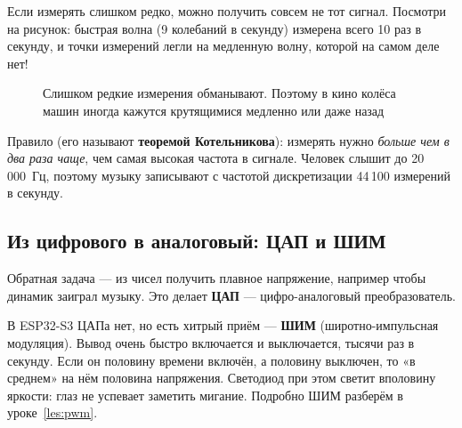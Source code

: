 Если измерять слишком редко, можно получить совсем не тот сигнал. Посмотри на рисунок: быстрая волна
(9 колебаний в секунду) измерена всего 10 раз в секунду, и точки измерений легли на медленную волну,
которой на самом деле нет!

\begin{figure}[H]
\centering
{}
\caption{Слишком редкие измерения обманывают. Поэтому в кино колёса машин иногда
кажутся крутящимися медленно или даже назад}
\end{figure}

Правило (его называют \textbf{теоремой Котельникова}): измерять нужно \emph{больше чем в два раза чаще},
чем самая высокая частота в сигнале. Человек слышит до 20\,000~Гц, поэтому музыку записывают с частотой
дискретизации 44\,100 измерений в секунду.

\subsection*{Из цифрового в аналоговый: ЦАП и ШИМ}

Обратная задача --- из чисел получить плавное напряжение, например чтобы динамик заиграл музыку.
Это делает \textbf{ЦАП} --- цифро-аналоговый преобразователь.

В ESP32-S3 ЦАПа нет, но есть хитрый приём --- \textbf{ШИМ} (широтно-импульсная модуляция).
Вывод очень быстро включается и выключается, тысячи раз в секунду. Если он половину времени
включён, а половину выключен, то «в среднем» на нём половина напряжения. Светодиод при этом светит
вполовину яркости: глаз не успевает заметить мигание. Подробно ШИМ разберём в уроке~\ref{les:pwm}.


